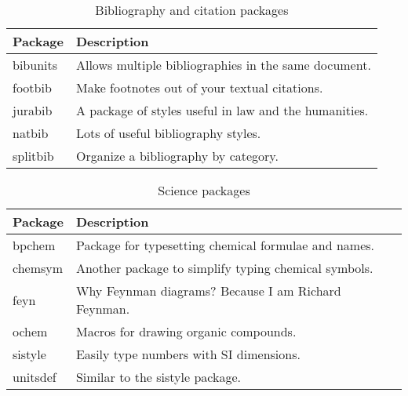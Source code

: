 \begin{table}
  \centering
  \caption{Bibliography and citation packages}
  \label{tab:bib-cite-pack}
  \begin{tabular}{@{}ll@{}}
    \toprule
    Package & Description \\
    \midrule
    bibunits & Allows multiple \BibTeX{} bibliographies in the same
    document. \\
    footbib & Make footnotes out of your textual citations. \\
    jurabib & A \BibTeX{} package of styles useful in law and the
    humanities. \\
    natbib & Lots of useful bibliography styles. \\
    splitbib & Organize a bibliography by category. \\
    \bottomrule
  \end{tabular}  
\end{table}

\begin{table}
  \centering
  \caption{Science packages}
  \label{tab:science}
  \begin{tabular}{@{}ll@{}}
    \toprule
    Package & Description \\
    \midrule
    bpchem & Package for typesetting chemical formulae and names. \\
    chemsym & Another package to simplify typing chemical symbols. \\
    feyn & Why Feynman diagrams?  Because I am Richard Feynman. \\
    ochem & Macros for drawing organic compounds. \\
    sistyle & Easily type numbers with SI dimensions. \\
    unitsdef & Similar to the sistyle package. \\
    \bottomrule
  \end{tabular}  
\end{table}

